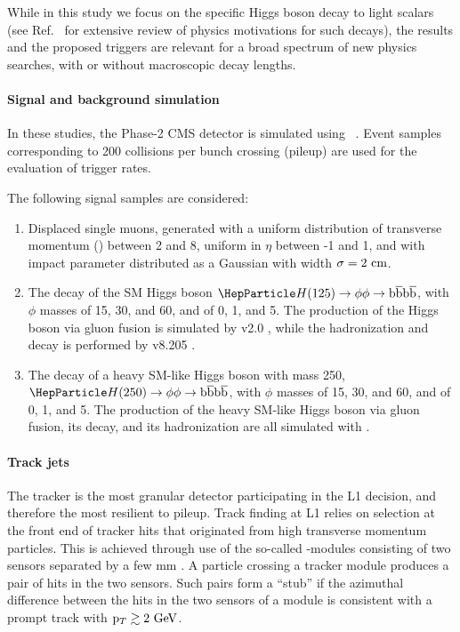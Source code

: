 While in this study we focus on the specific Higgs boson decay to light scalars (see Ref.~\cite{bsmh} for extensive review of physics motivations for such decays),
the results and the proposed triggers are relevant for a broad spectrum of new physics searches, with or without macroscopic decay lengths.

\paragraph{Signal and background simulation}

In these studies, the Phase-2 CMS detector is simulated using \GEANTfour~\cite{geant}.
Event samples corresponding to 200 collisions per bunch crossing (pileup) \cite{cmstdr-017} are used for the evaluation of trigger rates.

The following signal samples are considered:
\begin{enumerate}
\item Displaced single muons, generated with a uniform distribution of transverse momentum (\pt) between 2 and 8\UGeV, uniform
in $\eta$ between -1 and 1, and with impact parameter \dtrans distributed as a Gaussian with width $\sigma=2~\text{cm}$.
\item The decay of the SM Higgs boson $\PH(125)\to \phi\phi\to \bbbar\bbbar$, with $\phi$ masses of 15, 30, and 60\UGeV, and \ctau of 0, 1, and 5\Ucm.
The production of the Higgs boson via gluon fusion is simulated by \POWHEG v2.0 \cite{powheg}, while the hadronization and decay is performed by \PYTHIA v8.205 \cite{pythia}.
\item The decay of a heavy SM-like Higgs boson with mass 250\UGeV, $\PH(250)\to \phi\phi\to \bbbar\bbbar$, with $\phi$ masses of 15, 30, and 60\UGeV, and \ctau of 0, 1, and 5\Ucm.
The production of the heavy SM-like Higgs boson via gluon fusion, its decay, and its hadronization are all simulated with  \cite{pythia}.
\end{enumerate}

\paragraph{Track jets}
\label{sec:trackjets}

The tracker is the most granular detector participating in the L1 decision, and therefore the most resilient to pileup. 
Track finding at L1 relies on selection at the front end of tracker hits that originated from high transverse momentum particles.
This is achieved through use of the so-called \pt-modules consisting of two sensors separated by a few mm \cite{cmstdr-014}. A particle crossing a tracker module
produces a pair of hits in the two sensors. Such pairs form a ``stub'' if the azimuthal difference between the hits in the two sensors of a module is consistent
with a prompt track with $\mathrm{p}_{T} \gtrsim 2~\text{GeV}$.

